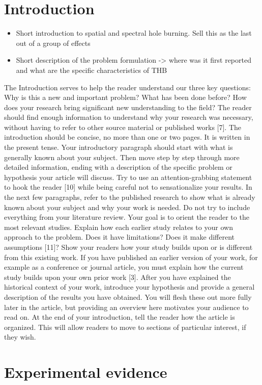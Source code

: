 \documentclass[journal]{IEEEtran}
\begin{document}
\section{Introduction}
	\begin{itemize}
		\item {Short introduction to spatial and spectral hole burning. Sell this as the last out of a group of effects} 
		\item {Short description of the problem formulation -> where was it first reported and what are the specific characteristics of THB} 
	\end{itemize}
The Introduction serves to help the reader understand our
three key questions: Why is this a new and important problem?
What has been done before? How does your research bring
significant new understanding to the field? The reader should
find enough information to understand why your research was
necessary, without having to refer to other source material or
published works [7]. The introduction should be concise, no
more than one or two pages. It is written in the present tense.
Your introductory paragraph should start with what is generally
known about your subject. Then move step by step through
more detailed information, ending with a description of the
specific problem or hypothesis your article will discuss. Try to
use an attention-grabbing statement to hook the reader [10]
while being careful not to sensationalize your results.
In the next few paragraphs, refer to the published research to
show what is already known about your subject and why your
work is needed. Do not try to include everything from your
literature review. Your goal is to orient the reader to the most
relevant studies. Explain how each earlier study relates to your
own approach to the problem. Does it have limitations? Does it
make different assumptions [11]? Show your readers how your
study builds upon or is different from this existing work. If you
have published an earlier version of your work, for example as a
conference or journal article, you must explain how the current
study builds upon your own prior work [3].
After you have explained the historical context of your work,
introduce your hypothesis and provide a general description of
the results you have obtained. You will flesh these out more
fully later in the article, but providing an overview here motivates
your audience to read on. At the end of your introduction, tell
the reader how the article is organized. This will allow readers to
move to sections of particular interest, if they wish.
\section{Experimental evidence}
\end{document}
